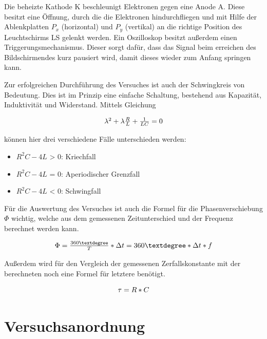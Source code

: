 \documentclass[12pt,a4paper,twoside]{article}
\begin{document}
\noindent
Die beheizte Kathode K beschleunigt Elektronen gegen eine Anode A. Diese besitzt eine Öffnung, durch die die Elektronen hindurchfliegen und mit Hilfe der Ablenkplatten $P_{x}$ (horizontal) und $P_{y}$ (vertikal) an die richtige Position des Leuchtschirms LS gelenkt werden. 
Ein Oszilloskop besitzt außerdem einen Triggerungsmechanismus. Dieser sorgt dafür, dass das Signal beim erreichen des Bildschirmendes kurz pausiert wird, damit dieses wieder zum Anfang springen kann. \newline

\noindent
Zur erfolgreichen Durchführung des Versuches ist auch der Schwingkreis von Bedeutung. Dies ist im Prinzip eine einfache Schaltung, bestehend aus Kapazität, Induktivität und Widerstand.
Mittels Gleichung

    \begin{equation}
        \label{eq:SchwingkreisGleichungFälle}
        \centerline{$\lambda^2 + \lambda \frac{R}{L} + \frac{1}{LC} = 0 $}
    \end{equation}

\noindent
können hier drei verschiedene Fälle unterschieden werden:

\begin{itemize}
    \item $R^2C - 4L$ > 0: Kriechfall
    \item $R^2C - 4L$ = 0: Aperiodischer Grenzfall
    \item $R^2C - 4L$ < 0: Schwingfall
\end{itemize}

\noindent
Für die Auswertung des Versuches ist auch die Formel für die Phasenverschiebung $\Phi$ wichtig, welche aus dem gemessenen Zeitunterschied und der Frequenz berechnet werden kann.

\begin{equation}
    \label{eq:Phasenversatz}
    \centerline{$\Phi = \frac{360°}{T}*\Delta t = 360° * \Delta t * f$}
\end{equation}

\noindent
Außerdem wird für den Vergleich der gemessenen Zerfallskonstante mit der berechneten noch eine Formel für letztere benötigt.

\begin{equation}
    \label{eq:Zerfallskonstante}
    \centerline{$\tau = R*C$}
\end{equation}


\section{Versuchsanordnung} %
\end{document}
